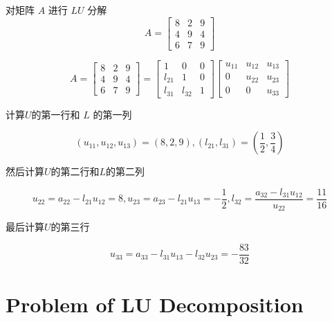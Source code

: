 \begin{example}
    对矩阵 $ A $ 进行 $ L U $ 分解
    $$
        A=\left[\begin{array}{lll}
                8 & 2 & 9 \\
                4 & 9 & 4 \\
                6 & 7 & 9
            \end{array}\right]
    $$


    $$ A=\left[\begin{array}{lll}8 & 2 & 9 \\ 4 & 9 & 4 \\ 6 & 7 & 9\end{array}\right]=\left[\begin{array}{ccc}1 & 0 & 0 \\ l_{21} & 1 & 0 \\ l_{31} & l_{32} & 1\end{array}\right]\left[\begin{array}{ccc}u_{11} & u_{12} & u_{13} \\ 0 & u_{22} & u_{23} \\ 0 & 0 & u_{33}\end{array}\right] $$

    计算$U$的第一行和 $ L $ 的第一列

    $$ \left(u_{11}, u_{12}, u_{13}\right)=(8,2,9) , \left(l_{21}, l_{31}\right)=\left(\frac{1}{2}, \frac{3}{4}\right) $$

    然后计算$U$的第二行和$L$的第二列

    $$ u_{22}=a_{22}-l_{21} u_{12}=8 ,
        u_{23}=a_{23}-l_{21} u_{13}=-\frac{1}{2} , l_{32}=\frac{a_{32}-l_{31} u_{12}}{u_{22}}=\frac{11}{16} $$


    最后计算$U$的第三行

    $$ u_{33}=a_{33}-l_{31}  u_{13}-l_{32} u_{23}=-\frac{83}{32} $$

\end{example}

\section{Problem of LU Decomposition}


